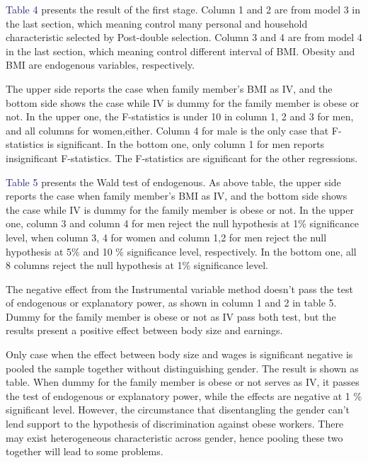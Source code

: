 \documentclass{article}
\begin{document}
\textcolor{MidnightBlue}{Table 4} presents the result of the first stage. Column 1 and 2 are from model 3 in the last section, which meaning control many personal and household characteristic selected by Post-double selection. Column 3 and 4 are from model 4 in the last section, which meaning control different interval of BMI. Obesity and BMI are endogenous variables, respectively.
\par
\setlength{\parindent}{2em}
The upper side reports the case when family member's BMI as IV, and the bottom side shows the case while IV is dummy for the family member is obese or not. In the upper one, the F-statistics is under 10 in column 1, 2 and 3 for men, and all columns for women,either. Column 4 for male is the only case that F-statistics is significant. In the bottom one, only column 1 for men reports insignificant F-statistics. The F-statistics are significant for the other regressions.
\par
\setlength{\parindent}{2em}
\textcolor{MidnightBlue}{Table 5} presents the Wald test of endogenous. As above table, the upper side reports the case when family member's BMI as IV, and the bottom side shows the case while IV is dummy for the family member is obese or not. In the upper one, column 3 and column 4 for men reject the null hypothesis at 1\% significance level, when column 3, 4 for women and column 1,2 for men reject the null hypothesis at 5\% and 10 \% significance level, respectively. In the bottom one, all 8 columns reject the null hypothesis at 1\% significance level.
\par
\setlength{\parindent}{2em}
The negative effect from the Instrumental variable method doesn't pass the test of endogenous or explanatory power, as shown in column 1 and 2 in table 5. Dummy for the family member is obese or not as IV pass both test, but the results present a positive effect between body size and earnings.
\par
\setlength{\parindent}{2em}
Only case when the effect between body size and wages is significant negative is pooled the sample together without distinguishing gender. The result is shown as table. When dummy for the family member is obese or not serves as IV, it passes the test of endogenous or explanatory power, while the effects are negative at 1 \% significant level. However, the circumstance that disentangling the gender can't lend support to the hypothesis of discrimination against obese workers. There may exist heterogeneous characteristic across gender, hence pooling these two together will lead to some problems.  
\end{document}
